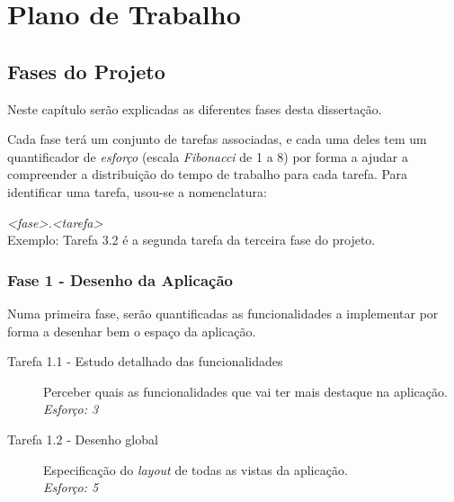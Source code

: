 
\chapter{Plano de Trabalho}\label{chap:chap4}

\section*{}


\section{Fases do Projeto} %
\label{sec:fases_projeto}

  Neste capítulo serão explicadas as diferentes fases desta dissertação.

  Cada fase terá um conjunto de tarefas associadas, e cada uma deles tem um quantificador de \emph{esforço} (escala \emph{Fibonacci} de 1 a 8) por forma a ajudar a compreender a distribuição do tempo de trabalho para cada tarefa.
  Para identificar uma tarefa, usou-se a nomenclatura:


  \emph{<fase>.<tarefa>} \\

  Exemplo: Tarefa 3.2 é a segunda tarefa da terceira fase do projeto.

  \subsection{Fase 1 - Desenho da Aplicação} %
  \label{sub:dev_desenho}
  
    Numa primeira fase, serão quantificadas as funcionalidades a implementar por forma a desenhar bem o espaço da aplicação.

    \begin{description}
      \item[Tarefa 1.1 - Estudo detalhado das funcionalidades]
      Perceber quais as funcionalidades que vai ter mais destaque na aplicação. \\
      \emph{Esforço: 3}

      \item[Tarefa 1.2 - Desenho global]
      Especificação do \emph{layout} de todas as vistas da aplicação. \\
      \emph{Esforço: 5}

    \end{description}

